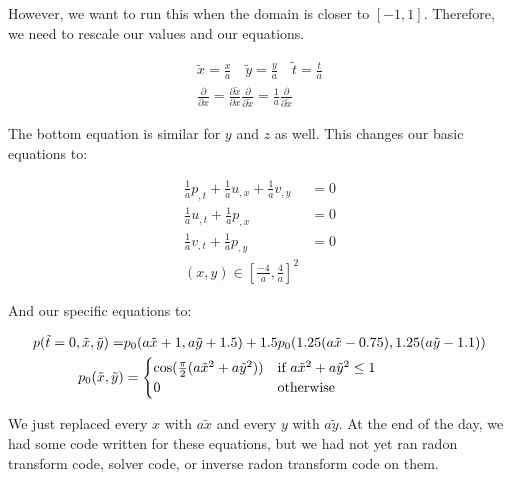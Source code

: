 However, we want to run this when the domain is closer to $[-1, 1]$. Therefore, we need to rescale our values and our equations.

\begin{align*}
\tilde{x} = \frac{x}{a} \quad
\tilde{y} = \frac{y}{a} \quad
\tilde{t} = \frac{t}{a} \\
\frac{\partial}{\partial x} = \frac{\partial \tilde{x}}{\partial x} \frac{\partial}{\partial \tilde{x}} = \frac{1}{a} \frac{\partial}{\partial \tilde{x}}
\end{align*}

The bottom equation is similar for $y$ and $z$ as well. This changes our basic equations to: 

\begin{align*}
\frac{1}{a}p_{,t} + \frac{1}{a}u_{,x} + \frac{1}{a}v_{,y} &= 0 \\
\frac{1}{a}u_{,t} + \frac{1}{a}p_{,x} &= 0 \\
\frac{1}{a}v_{,t} + \frac{1}{a}p_{,y} &= 0 \\
(x, y) \in \left[\frac{-4}{a}, \frac{4}{a}\right]^2
\end{align*}

And our specific equations to:

\begin{align*}
p(\tilde{t} = 0, \tilde{x}, \tilde{y}) = &p_0(a\tilde{x} + 1, a\tilde{y} + 1.5) + 1.5p_0(1.25(a\tilde{x} - 0.75), 1.25(a\tilde{y} - 1.1)) \\
p_0(\tilde{x}, \tilde{y}) &= 
\begin{cases}
\cos(\frac{\pi}{2}(a\tilde{x}^2 + a\tilde{y}^2)) & \text{if } a\tilde{x}^2 + a\tilde{y}^2 \leq 1 \\
0 & \mbox{\text{otherwise} }
\end{cases}
\end{align*}

We just replaced every $x$ with $a\tilde{x}$ and every $y$ with $a\tilde{y}$. At the end of the day, we had some code written for these equations, but we had not yet ran radon transform code, solver code, or inverse radon transform code on them. 